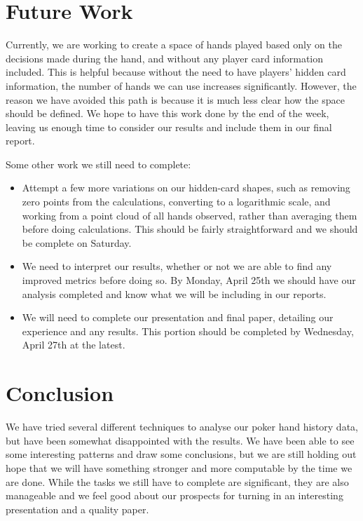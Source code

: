 \documentclass[11pt]{article}
\begin{document}

\section*{Future Work}
Currently, we are working to create a space of hands played based only on the
decisions made during the hand, and without any player card information
included. This is helpful because without the need to have players' hidden card
information, the number of hands we can use increases significantly. However,
the reason we have avoided this path is because it is much less clear how the
space should be defined. We hope to have this work done by the end of the week,
leaving us enough time to consider our results and include them in our final
report.

Some other work we still need to complete:

\begin{itemize}[noitemsep]
	\item Attempt a few more variations on our hidden-card shapes, such as
	removing zero points from the calculations, converting to a logarithmic
	scale, and working from a point cloud of all hands observed, rather than
	averaging them before doing calculations. This should be fairly straightforward
	and we should be complete on Saturday.
	\item We need to interpret our results, whether or not we are able to find
	any improved metrics before doing so. By Monday, April 25th we should have
	our analysis completed and know what we will be including in our reports.
	\item We will need to complete our presentation and final paper, detailing
	our experience and any results. This portion should be completed by Wednesday,
	April 27th at the latest.
\end{itemize}

\section*{Conclusion}
We have tried several different techniques to analyse our poker hand history data,
but have been somewhat disappointed with the results. We have been able to see
some interesting patterns and draw some conclusions, but we are still holding out
hope that we will have something stronger and more computable by the time we are 
done. While the tasks we still have to complete are significant, they are also
manageable and we feel good about our prospects for turning in an interesting
presentation and a quality paper.
\end{document}
